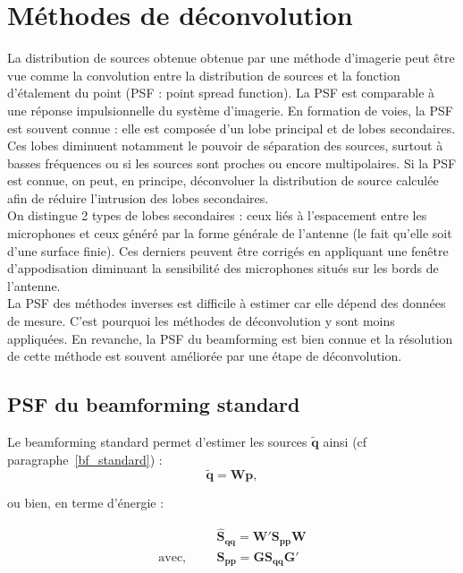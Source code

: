 \chapter{Méthodes de déconvolution\label{deconvolution}}

La distribution de sources obtenue obtenue par une méthode d'imagerie peut être vue comme la convolution entre la distribution de sources et la fonction d'étalement du point (PSF : point spread function). La PSF est comparable à une réponse impulsionnelle du système d'imagerie. En formation de voies, la PSF est souvent connue \citep{Bahr2011a}: elle est composée d'un lobe principal et de lobes secondaires. \\

Ces lobes diminuent notamment le pouvoir de séparation des sources, surtout à basses fréquences ou si les sources sont proches ou encore multipolaires. Si la PSF est connue, on peut, en principe, déconvoluer la distribution  de source calculée afin de réduire l'intrusion des lobes secondaires.\\

On distingue 2 types de lobes secondaires : ceux liés à l'espacement entre les microphones et ceux généré par la forme générale de l'antenne (le fait qu'elle soit d'une surface finie). Ces derniers peuvent être corrigés en appliquant une fenêtre d'appodisation diminuant la sensibilité des microphones situés sur les bords de l'antenne.\\


La PSF des méthodes inverses est difficile à estimer car elle dépend des données de mesure. C'est pourquoi les méthodes de déconvolution y sont moins appliquées. En revanche, la PSF du beamforming est bien connue et la résolution de cette méthode est souvent améliorée par une étape de déconvolution.\\

\section{PSF du beamforming standard}

Le beamforming standard permet d'estimer les sources $\bm{\tilde{q}}$ ainsi (cf paragraphe~\ref{bf_standard}) : 
\begin{equation}
	\bm{\tilde{q}} = \bm{W}\bm{p},
\end{equation}

ou bien, en terme d'énergie : 

\begin{align}\label{bf_psf}
	~ & \bm{\hat{S}_{qq}} = \bm{W}' \bm{S_{pp}} \bm{W}  \\
	\text{avec, ~~~~} & \bm{S_{pp}} = \bm{G S_{qq}G}'
\end{align}

